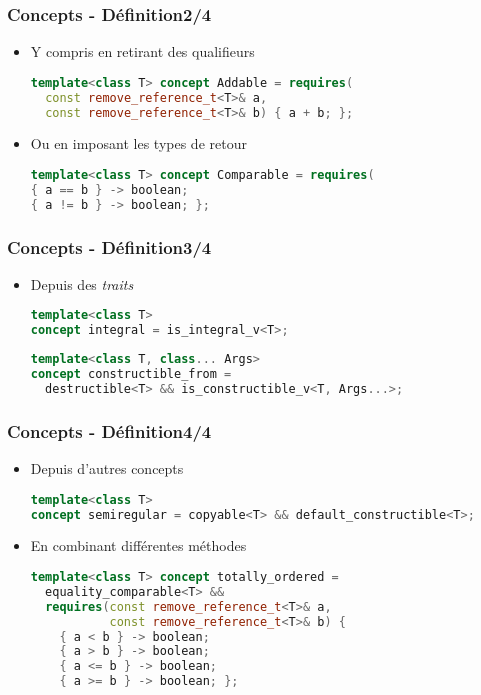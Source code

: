 \documentclass[C++.tex]{subfiles}
\begin{document}
\begin{frame}[fragile]
	\frametitle{Concepts - Définition\titlehfill{}2/4}
	\begin{itemize}
		\item Y compris en retirant des qualifieurs

		\begin{lstlisting}[language=C++]
template<class T> concept Addable = requires(
  const remove_reference_t<T>& a,
  const remove_reference_t<T>& b) { a + b; };\end{lstlisting}

		\item Ou en imposant les types de retour

		\begin{lstlisting}[language=C++]
template<class T> concept Comparable = requires(
{ a == b } -> boolean;
{ a != b } -> boolean; };\end{lstlisting}
	\end{itemize}
\end{frame}

\begin{frame}[fragile]
	\frametitle{Concepts - Définition\titlehfill{}3/4}
	\begin{itemize}
		\item Depuis des \textit{traits}

		\begin{lstlisting}[language=C++]
template<class T>
concept integral = is_integral_v<T>;\end{lstlisting}

		\begin{lstlisting}[language=C++]
template<class T, class... Args>
concept constructible_from = 
  destructible<T> && is_constructible_v<T, Args...>;\end{lstlisting}
	\end{itemize}
\end{frame}

\begin{frame}[fragile]
	\frametitle{Concepts - Définition\titlehfill{}4/4}
	\begin{itemize}
		\item Depuis d'autres concepts

		\begin{lstlisting}[language=C++]
template<class T>
concept semiregular = copyable<T> && default_constructible<T>;\end{lstlisting}

		\item En combinant différentes méthodes

		\begin{lstlisting}[language=C++]
template<class T> concept totally_ordered =
  equality_comparable<T> &&
  requires(const remove_reference_t<T>& a,
           const remove_reference_t<T>& b) {
    { a < b } -> boolean;
    { a > b } -> boolean;
    { a <= b } -> boolean;
    { a >= b } -> boolean; };\end{lstlisting}
	\end{itemize}
\end{frame}
\end{document}
